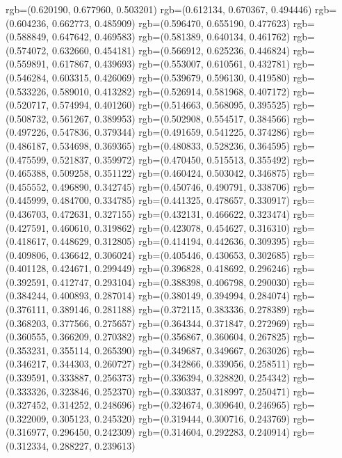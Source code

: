 {{{					rgb=(0.620190, 0.677960, 0.503201)
					rgb=(0.612134, 0.670367, 0.494446)
					rgb=(0.604236, 0.662773, 0.485909)
					rgb=(0.596470, 0.655190, 0.477623)
					rgb=(0.588849, 0.647642, 0.469583)
					rgb=(0.581389, 0.640134, 0.461762)
					rgb=(0.574072, 0.632660, 0.454181)
					rgb=(0.566912, 0.625236, 0.446824)
					rgb=(0.559891, 0.617867, 0.439693)
					rgb=(0.553007, 0.610561, 0.432781)
					rgb=(0.546284, 0.603315, 0.426069)
					rgb=(0.539679, 0.596130, 0.419580)
					rgb=(0.533226, 0.589010, 0.413282)
					rgb=(0.526914, 0.581968, 0.407172)
					rgb=(0.520717, 0.574994, 0.401260)
					rgb=(0.514663, 0.568095, 0.395525)
					rgb=(0.508732, 0.561267, 0.389953)
					rgb=(0.502908, 0.554517, 0.384566)
					rgb=(0.497226, 0.547836, 0.379344)
					rgb=(0.491659, 0.541225, 0.374286)
					rgb=(0.486187, 0.534698, 0.369365)
					rgb=(0.480833, 0.528236, 0.364595)
					rgb=(0.475599, 0.521837, 0.359972)
					rgb=(0.470450, 0.515513, 0.355492)
					rgb=(0.465388, 0.509258, 0.351122)
					rgb=(0.460424, 0.503042, 0.346875)
					rgb=(0.455552, 0.496890, 0.342745)
					rgb=(0.450746, 0.490791, 0.338706)
					rgb=(0.445999, 0.484700, 0.334785)
					rgb=(0.441325, 0.478657, 0.330917)
					rgb=(0.436703, 0.472631, 0.327155)
					rgb=(0.432131, 0.466622, 0.323474)
					rgb=(0.427591, 0.460610, 0.319862)
					rgb=(0.423078, 0.454627, 0.316310)
					rgb=(0.418617, 0.448629, 0.312805)
					rgb=(0.414194, 0.442636, 0.309395)
					rgb=(0.409806, 0.436642, 0.306024)
					rgb=(0.405446, 0.430653, 0.302685)
					rgb=(0.401128, 0.424671, 0.299449)
					rgb=(0.396828, 0.418692, 0.296246)
					rgb=(0.392591, 0.412747, 0.293104)
					rgb=(0.388398, 0.406798, 0.290030)
					rgb=(0.384244, 0.400893, 0.287014)
					rgb=(0.380149, 0.394994, 0.284074)
					rgb=(0.376111, 0.389146, 0.281188)
					rgb=(0.372115, 0.383336, 0.278389)
					rgb=(0.368203, 0.377566, 0.275657)
					rgb=(0.364344, 0.371847, 0.272969)
					rgb=(0.360555, 0.366209, 0.270382)
					rgb=(0.356867, 0.360604, 0.267825)
					rgb=(0.353231, 0.355114, 0.265390)
					rgb=(0.349687, 0.349667, 0.263026)
					rgb=(0.346217, 0.344303, 0.260727)
					rgb=(0.342866, 0.339056, 0.258511)
					rgb=(0.339591, 0.333887, 0.256373)
					rgb=(0.336394, 0.328820, 0.254342)
					rgb=(0.333326, 0.323846, 0.252370)
					rgb=(0.330337, 0.318997, 0.250471)
					rgb=(0.327452, 0.314252, 0.248696)
					rgb=(0.324674, 0.309640, 0.246965)
					rgb=(0.322009, 0.305123, 0.245320)
					rgb=(0.319444, 0.300716, 0.243769)
					rgb=(0.316977, 0.296450, 0.242309)
					rgb=(0.314604, 0.292283, 0.240914)
					rgb=(0.312334, 0.288227, 0.239613)
}}}
